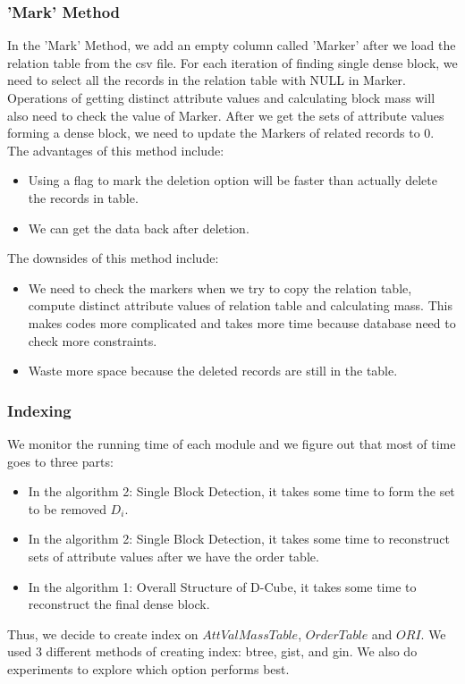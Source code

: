 \subsubsection{'Mark' Method}
In the 'Mark' Method, we add an empty column called 'Marker' after we load the relation table from the csv file. For each iteration of finding single dense block, we need to select all the records in the relation table with NULL in Marker. Operations of getting distinct attribute values and calculating block mass will also need to check the value of Marker. After we get the sets of attribute values forming a dense block, we need to update the Markers of related records to 0. \\
The advantages of this method include:
\begin{itemize}
    \item Using a flag to mark the deletion option will be faster than actually delete the records in table.
    \item We can get the data back after deletion.
\end{itemize}
The downsides of this method include:
\begin{itemize}
    \item We need to check the markers when we try to copy the relation table, compute distinct attribute values of relation table and calculating mass. This makes codes more complicated and takes more time because database need to check more constraints.
    \item Waste more space because the deleted records are still in the table.
\end{itemize}

\subsubsection{Indexing}
We monitor the running time of each module and we figure out that most of time goes to three parts: 
\begin{itemize}
    \item In the algorithm 2: Single Block Detection, it takes some time to form the set to be removed $D_i$.
    \item In the algorithm 2: Single Block Detection, it takes some time to reconstruct sets of attribute values after we have the order table.
    \item In the algorithm 1: Overall Structure of D-Cube, it takes some time to reconstruct the final dense block.
\end{itemize}
Thus, we decide to create index on $AttValMassTable$, $OrderTable$ and $ORI$. We used 3 different methods of creating index: btree, gist, and gin. We also do experiments to explore which option performs best. \\

